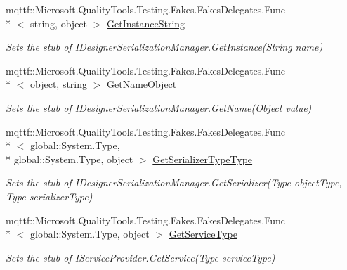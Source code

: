 \begin{DoxyCompactItemize}
mqttf\-::\-Microsoft.\-Quality\-Tools.\-Testing.\-Fakes.\-Fakes\-Delegates.\-Func\\*
$<$ string, object $>$ \hyperlink{class_system_1_1_component_model_1_1_design_1_1_serialization_1_1_fakes_1_1_stub_i_designer_serialization_manager_a1d55ff6d23ff3062e16e4dc86af507ac}{Get\-Instance\-String}
\begin{DoxyCompactList}\small\item\em Sets the stub of I\-Designer\-Serialization\-Manager.\-Get\-Instance(\-String name)\end{DoxyCompactList}\item 
mqttf\-::\-Microsoft.\-Quality\-Tools.\-Testing.\-Fakes.\-Fakes\-Delegates.\-Func\\*
$<$ object, string $>$ \hyperlink{class_system_1_1_component_model_1_1_design_1_1_serialization_1_1_fakes_1_1_stub_i_designer_serialization_manager_afd4daeeaee221b0c6d546aaf15fe93b0}{Get\-Name\-Object}
\begin{DoxyCompactList}\small\item\em Sets the stub of I\-Designer\-Serialization\-Manager.\-Get\-Name(\-Object value)\end{DoxyCompactList}\item 
mqttf\-::\-Microsoft.\-Quality\-Tools.\-Testing.\-Fakes.\-Fakes\-Delegates.\-Func\\*
$<$ global\-::\-System.\-Type, \\*
global\-::\-System.\-Type, object $>$ \hyperlink{class_system_1_1_component_model_1_1_design_1_1_serialization_1_1_fakes_1_1_stub_i_designer_serialization_manager_a0b94c5343d762d10306b00f705519248}{Get\-Serializer\-Type\-Type}
\begin{DoxyCompactList}\small\item\em Sets the stub of I\-Designer\-Serialization\-Manager.\-Get\-Serializer(\-Type object\-Type, Type serializer\-Type)\end{DoxyCompactList}\item 
mqttf\-::\-Microsoft.\-Quality\-Tools.\-Testing.\-Fakes.\-Fakes\-Delegates.\-Func\\*
$<$ global\-::\-System.\-Type, object $>$ \hyperlink{class_system_1_1_component_model_1_1_design_1_1_serialization_1_1_fakes_1_1_stub_i_designer_serialization_manager_a57ea1a52a0a5725bdc59bd7d321c5563}{Get\-Service\-Type}
\begin{DoxyCompactList}\small\item\em Sets the stub of I\-Service\-Provider.\-Get\-Service(\-Type service\-Type)\end{DoxyCompactList}\item 

\end{DoxyCompactItemize}
